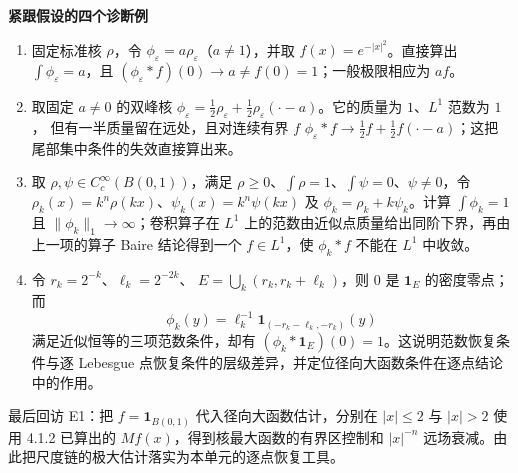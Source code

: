 \documentclass[11pt,a4paper]{ctexart}
\newcommand{\eps}{\varepsilon}
\newcommand{\planitem}[1]{\par\smallskip\noindent\textcolor{deepblue}{\textbf{#1}}\quad}
\begin{document}
\planitem{紧跟假设的四个诊断例}
\begin{enumerate}
\item 固定标准核 $\rho$，令 $\phi_\eps=a\rho_\eps$（$a\ne1$），并取
$f(x)=e^{-|x|^2}$。直接算出 $\int\phi_\eps=a$，且
$(\phi_\eps*f)(0)\to a\ne f(0)=1$；一般极限相应为 $af$。
\item 取固定 $a\ne0$ 的双峰核
$\phi_\eps=\tfrac12\rho_\eps+\tfrac12\rho_\eps(\cdot-a)$。它的质量为 $1$、$L^1$ 范数为 $1$，
但有一半质量留在远处，且对连续有界 $f$
$\phi_\eps*f\to\tfrac12f+\tfrac12f(\cdot-a)$；这把尾部集中条件的失效直接算出来。
\item 取 $\rho,\psi\in C_c^\infty(B(0,1))$，满足 $\rho\ge0$、$\int\rho=1$、$\int\psi=0$、$\psi\ne0$，令
$\rho_k(x)=k^n\rho(kx)$、$\psi_k(x)=k^n\psi(kx)$ 及
$\phi_k=\rho_k+k\psi_k$。计算
$\int\phi_k=1$ 且 $\|\phi_k\|_1\to\infty$；卷积算子在 $L^1$ 上的范数由近似点质量给出同阶下界，再由上一项的算子 Baire 结论得到一个 $f\in L^1$，使 $\phi_k*f$ 不能在 $L^1$ 中收敛。
\item 令 $r_k=2^{-k}$、$\ell_k=2^{-2k}$、
$E=\bigcup_k(r_k,r_k+\ell_k)$，则 $0$ 是 $\mathbf1_E$ 的密度零点；而
\[
\phi_k(y)=\ell_k^{-1}\mathbf1_{(-r_k-\ell_k,-r_k)}(y)
\]
满足近似恒等的三项范数条件，却有
$(\phi_k*\mathbf1_E)(0)=1$。这说明范数恢复条件与逐 Lebesgue 点恢复条件的层级差异，并定位径向大函数条件在逐点结论中的作用。
\end{enumerate}

最后回访 E1：把 $f=\mathbf1_{B(0,1)}$ 代入径向大函数估计，分别在 $|x|\le2$ 与 $|x|>2$ 使用 4.1.2 已算出的 $Mf(x)$，得到核最大函数的有界区控制和 $|x|^{-n}$ 远场衰减。由此把尺度链的极大估计落实为本单元的逐点恢复工具。
\end{document}
